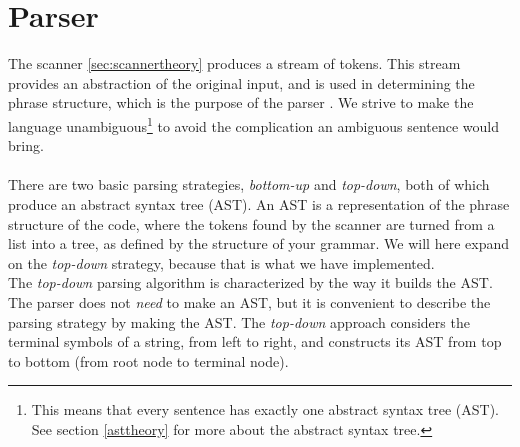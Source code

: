 \section{Parser}
\label{sec:parser}
The scanner \ref{sec:scannertheory} produces a stream of tokens. This stream provides an abstraction of the original input, and is used in determining the phrase structure, which is the purpose of the parser \cite{misc:spo}. We strive to make the language unambiguous\footnote{This means that every sentence has exactly one abstract syntax tree (AST). See section \ref{asttheory} for more about the abstract syntax tree.} to avoid the complication an ambiguous sentence would bring.\\
\\
There are two basic parsing strategies, \textit{bottom-up} and \textit{top-down}, both of which produce an abstract syntax tree (AST). An AST is a representation of the phrase structure of the code, where the tokens found by the scanner are turned from a list into a tree, as defined by the structure of your grammar. \newline
We will here expand on the \textit{top-down} strategy, because that is what we have implemented.\\ \indent
The \textit{top-down} parsing algorithm is characterized by the way it builds the AST. The parser does not \textit{need} to make an AST, but it is convenient to describe the parsing strategy by making the AST. The \textit{top-down} approach considers the terminal symbols of a string, from left to right, and constructs its AST from top to bottom (from root node to terminal node).
